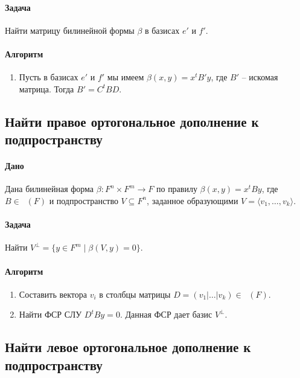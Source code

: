 \documentclass{article}
\newcommand{\MatrixDim}[3]{\mathop{\mathrm{M}_{#2\,#3}}(#1)}
\begin{document}
\paragraph{Задача} Найти матрицу билинейной формы $\beta$ в базисах $e'$ и $f'$.

\paragraph{Алгоритм}
\begin{enumerate}
\item Пусть в базисах $e'$ и $f'$ мы имеем $\beta (x, y) = x^t B' y$, где $B'$ -- искомая матрица. Тогда $B' = C^t B D$.
\end{enumerate}


\subsection{Найти правое ортогональное дополнение к подпространству}

\paragraph{Дано} Дана билинейная форма $\beta\colon F^n\times F^m \to F$ по правилу $\beta(x,y) = x^t B y$, где $B\in\MatrixDim{F}{n}{m}$ и подпространство $V\subseteq F^n$, заданное образующими $V = \langle v_1,\ldots,v_k\rangle$.

\paragraph{Задача} Найти $V^\bot = \{y\in F^m \mid \beta(V, y) = 0\}$.

\paragraph{Алгоритм}
\begin{enumerate}
\item Составить вектора $v_i$ в столбцы матрицы $D = (v_1|\ldots|v_k) \in \MatrixDim{F}{n}{k}$.

\item Найти ФСР СЛУ $D^tB y = 0$. Данная ФСР дает базис $V^\bot$.
\end{enumerate}

\subsection{Найти левое ортогональное дополнение к подпространству}
\end{document}
